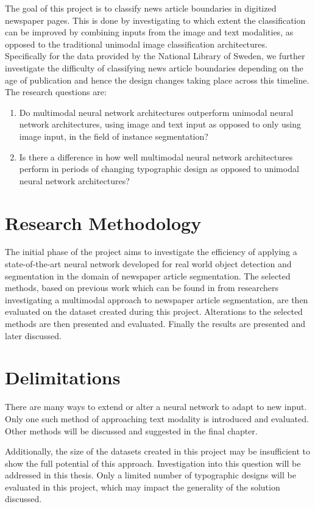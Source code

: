 \documentclass[oneside, english, bibtex]{kththesis}
\begin{document}
The goal of this project is to classify news article boundaries in digitized newspaper pages. This is done by investigating to which extent the classification can be improved by combining inputs from the image and text modalities, as opposed to the traditional unimodal image classification architectures. Specifically for the data provided by the National Library of Sweden, we further investigate the difficulty of classifying news article boundaries depending on the age of publication and hence the design changes taking place across this timeline. The research questions are:

\begin{enumerate}
\item Do multimodal neural network architectures outperform unimodal neural network architectures, using image and text input as opposed to only using image input, in the field of instance segmentation?
\item Is there a difference in how well multimodal neural network architectures perform in periods of changing typographic design as opposed to unimodal neural network architectures?
\end{enumerate}

\section{Research Methodology}

The initial phase of the project aims to investigate the efficiency of applying a state-of-the-art neural network developed for real world object detection and segmentation in the domain of newspaper article segmentation.
The selected methods, based on previous work which can be found in  from researchers investigating a multimodal approach to newspaper article segmentation, are then evaluated on the dataset created during this project.
Alterations to the selected methods are then presented and evaluated. Finally the results are presented and later discussed.

\section{Delimitations}

There are many ways to extend or alter a neural network to adapt to new input. Only one such method of approaching text modality is introduced and evaluated. Other methods will be discussed and suggested in the final chapter.

Additionally, the size of the datasets created in this project may be insufficient to show the full potential of this approach.
Investigation into this question will be addressed in this thesis.
Only a limited number of typographic designs will be evaluated in this project, which may impact the generality of the solution discussed.
\end{document}

